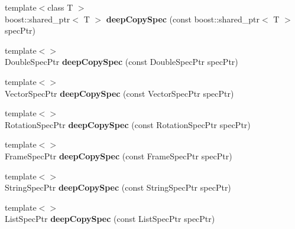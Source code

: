 \begin{DoxyCompactItemize}
\item 
\hypertarget{namespacegiskard__suturo_adbd065332d50fd902a9f29952f9e3e00}{{\footnotesize template$<$class T $>$ }\\boost\-::shared\-\_\-ptr$<$ T $>$ {\bfseries deep\-Copy\-Spec} (const boost\-::shared\-\_\-ptr$<$ T $>$ spec\-Ptr)}\label{namespacegiskard__suturo_adbd065332d50fd902a9f29952f9e3e00}

\item 
\hypertarget{namespacegiskard__suturo_a57fa6191ef854ed26fe6afe37bb833ec}{{\footnotesize template$<$$>$ }\\Double\-Spec\-Ptr {\bfseries deep\-Copy\-Spec} (const Double\-Spec\-Ptr spec\-Ptr)}\label{namespacegiskard__suturo_a57fa6191ef854ed26fe6afe37bb833ec}

\item 
\hypertarget{namespacegiskard__suturo_a7693ce4def7211efaf21182bd72130fa}{{\footnotesize template$<$$>$ }\\Vector\-Spec\-Ptr {\bfseries deep\-Copy\-Spec} (const Vector\-Spec\-Ptr spec\-Ptr)}\label{namespacegiskard__suturo_a7693ce4def7211efaf21182bd72130fa}

\item 
\hypertarget{namespacegiskard__suturo_addb0f1b81d7671c884c0783e40822b3e}{{\footnotesize template$<$$>$ }\\Rotation\-Spec\-Ptr {\bfseries deep\-Copy\-Spec} (const Rotation\-Spec\-Ptr spec\-Ptr)}\label{namespacegiskard__suturo_addb0f1b81d7671c884c0783e40822b3e}

\item 
\hypertarget{namespacegiskard__suturo_a80c0449956a79e62210f812a7354784c}{{\footnotesize template$<$$>$ }\\Frame\-Spec\-Ptr {\bfseries deep\-Copy\-Spec} (const Frame\-Spec\-Ptr spec\-Ptr)}\label{namespacegiskard__suturo_a80c0449956a79e62210f812a7354784c}

\item 
\hypertarget{namespacegiskard__suturo_a37b25edbc864a45f94e74d1832a4a5b7}{{\footnotesize template$<$$>$ }\\String\-Spec\-Ptr {\bfseries deep\-Copy\-Spec} (const String\-Spec\-Ptr spec\-Ptr)}\label{namespacegiskard__suturo_a37b25edbc864a45f94e74d1832a4a5b7}

\item 
\hypertarget{namespacegiskard__suturo_a2ba915775d62bec82b546a5a3b05f21d}{{\footnotesize template$<$$>$ }\\List\-Spec\-Ptr {\bfseries deep\-Copy\-Spec} (const List\-Spec\-Ptr spec\-Ptr)}\label{namespacegiskard__suturo_a2ba915775d62bec82b546a5a3b05f21d}


\end{DoxyCompactItemize}
